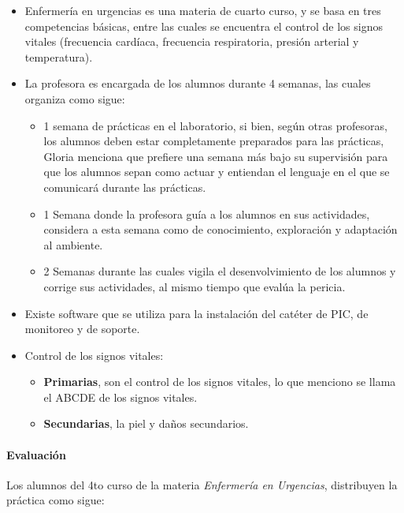 \begin{itemize}
\itemsep1pt\parskip0pt
\item
  Enfermería en urgencias es una materia de cuarto curso, y se basa en
  tres competencias básicas, entre las cuales se encuentra el control de
  los signos vitales (frecuencia cardíaca, frecuencia respiratoria,
  presión arterial y temperatura).
\item
  La profesora es encargada de los alumnos durante 4 semanas, las cuales
  organiza como sigue:

  \begin{itemize}
  \itemsep1pt\parskip0pt
  \item
    1 semana de prácticas en el laboratorio, si bien, según otras
    profesoras, los alumnos deben estar completamente preparados para
    las prácticas, Gloria menciona que prefiere una semana más bajo su
    supervisión para que los alumnos sepan como actuar y entiendan el
    lenguaje en el que se comunicará durante las prácticas.
  \item
    1 Semana donde la profesora guía a los alumnos en sus actividades,
    considera a esta semana como de conocimiento, exploración y
    adaptación al ambiente.
  \item
    2 Semanas durante las cuales vigila el desenvolvimiento de los
    alumnos y corrige sus actividades, al mismo tiempo que evalúa la
    pericia.
  \end{itemize}
\item
  Existe software que se utiliza para la instalación del catéter de PIC,
  de monitoreo y de soporte.
\item
  Control de los signos vitales:

  \begin{itemize}
  \itemsep1pt\parskip0pt
  \item
    \textbf{Primarias}, son el control de los signos vitales, lo que
    menciono se llama el ABCDE de los signos vitales.
  \item
    \textbf{Secundarias}, la piel y daños secundarios.
  \end{itemize}
\end{itemize}

\paragraph{Evaluación}\label{evaluaciuxf3n}

Los alumnos del 4to curso de la materia \emph{Enfermería en Urgencias},
distribuyen la práctica como sigue:

